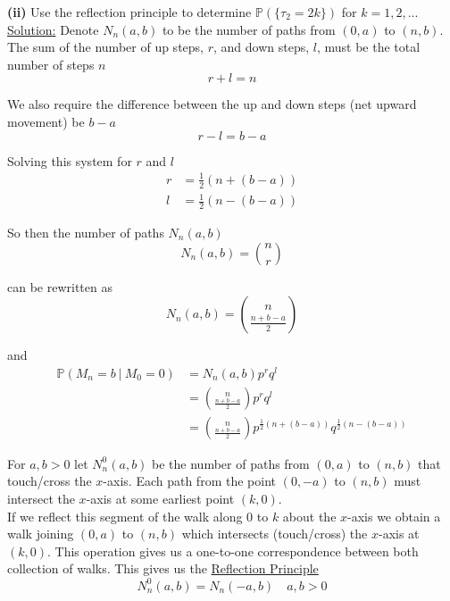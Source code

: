 \documentclass[12pt]{article}
\newlength\tindent
\renewcommand{\indent}{\hspace*{\tindent}}
\renewcommand{\P}{\mathbb P}
\begin{document}
{\bf (ii)} Use the reflection principle to determine $\P(\{\tau_2 = 2k\})$ for $k = 1,2,...$ \\

\underline{Solution:} Denote $N_n(a,b)$ to be the number of paths from $(0,a)$ to $(n,b)$. The sum of the number of up steps, $r$, and down steps, $l$, must be the total number of steps $n$
\begin{equation*}
	r + l = n
\end{equation*}

\indent We also require the difference between the up and down steps (net upward movement) be $b - a$ 
\begin{equation*}
	r - l = b - a
\end{equation*}

Solving this system for $r$ and $l$
\begin{align*}
	r &= \frac{1}{2}(n + (b - a)) \\
	l &= \frac{1}{2}(n - (b - a))
\end{align*}

So then the number of paths $N_n(a,b)$
\begin{equation*}
	N_n(a,b) = {{n}\choose{r}} 
\end{equation*}

can be rewritten as
\begin{equation*}
	N_n(a,b) = {{n}\choose{\frac{n + b - a}{2}}}
\end{equation*}

and
\begin{align*}
	\P(M_n = b ~|~ M_0 = 0) &= N_n(a,b) p^r q^l \\
	&= {{n}\choose{\frac{n + b - a}{2}}} p^r q^l \\
	&= {{n}\choose{\frac{n + b - a}{2}}} p^{ \frac{1}{2}(n + (b - a)) } q^{ \frac{1}{2}(n - (b - a)) }
\end{align*}

\indent For $a,b > 0$ let $N^0_n(a,b)$ be the number of paths from $(0,a)$ to $(n,b)$ that touch/cross the $x$-axis. Each path from the point $(0,-a)$ to $(n,b)$ must intersect the $x$-axis at some earliest point $(k,0)$. \\

\indent If we reflect this segment of the walk along $0$ to $k$ about the $x$-axis we obtain a walk joining $(0,a)$ to $(n,b)$ which intersects (touch/cross) the $x$-axis at $(k,0)$. This operation gives us a one-to-one correspondence between both collection of walks. This gives us the \underline{Reflection Principle}
\begin{equation*}
	N^0_n(a,b) = N_n(-a,b) \quad a,b > 0
\end{equation*}
\end{document}
